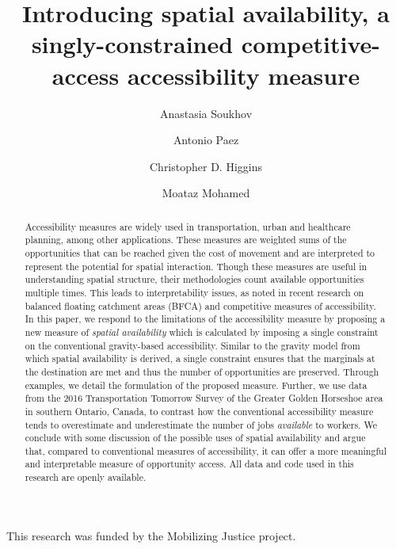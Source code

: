 \documentclass[]{elsarticle} %
\begin{document}
\begin{frontmatter}

  \title{Introducing spatial availability, a singly-constrained
competitive-access accessibility measure}
    \author[SEES]{Anastasia Soukhov}
    \author[SEES]{Antonio Paez}
    \author[UofTS]{Christopher D. Higgins}
    \author[CIVENG]{Moataz Mohamed}
      \address[SEES]{School of Earth, Environment and Society, McMaster
University, Hamilton, ON, L8S 4K1, Canada}
    \address[UofTS]{Department of Geography \& Planning, University of
Toronto Scarborough, 1265 Military Trail, Toronto, ON M1C1A4}
    \address[CIVENG]{Department of Civil Engineering, McMaster
University, Hamilton, ON, L8S 4K1, Canada}
  
  \begin{abstract}
  Accessibility measures are widely used in transportation, urban and
  healthcare planning, among other applications. These measures are
  weighted sums of the opportunities that can be reached given the cost
  of movement and are interpreted to represent the potential for spatial
  interaction. Though these measures are useful in understanding spatial
  structure, their methodologies count available opportunities multiple
  times. This leads to interpretability issues, as noted in recent
  research on balanced floating catchment areas (BFCA) and competitive
  measures of accessibility. In this paper, we respond to the
  limitations of the accessibility measure by proposing a new measure of
  \emph{spatial availability} which is calculated by imposing a single
  constraint on the conventional gravity-based accessibility. Similar to
  the gravity model from which spatial availability is derived, a single
  constraint ensures that the marginals at the destination are met and
  thus the number of opportunities are preserved. Through examples, we
  detail the formulation of the proposed measure. Further, we use data
  from the 2016 Transportation Tomorrow Survey of the Greater Golden
  Horseshoe area in southern Ontario, Canada, to contrast how the
  conventional accessibility measure tends to overestimate and
  underestimate the number of jobs \emph{available} to workers. We
  conclude with some discussion of the possible uses of spatial
  availability and argue that, compared to conventional measures of
  accessibility, it can offer a more meaningful and interpretable
  measure of opportunity access. All data and code used in this research
  are openly available.
  \end{abstract}
  
 \end{frontmatter}

This research was funded by the Mobilizing Justice project.
\end{document}
